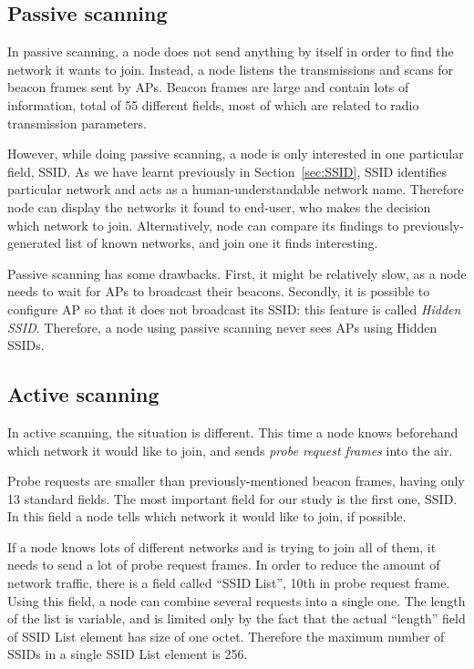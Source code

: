\documentclass[12pt,a4paper,oneside,pdftex]{report}
\begin{document}
\subsection{Passive scanning}
\label{subsec:passive_scanning}

In passive scanning, a node does not send anything by itself in order to find the network it wants to join. Instead, a node listens the transmissions and scans for beacon frames sent by APs. Beacon frames are large and contain lots of information, total of 55 different fields, most of which are related to radio transmission parameters.

However, while doing passive scanning, a node is only interested in one particular field, SSID. As we have learnt previously in Section~\ref{sec:SSID}, SSID identifies particular network and acts as a human-understandable network name. Therefore node can display the networks it found to end-user, who makes the decision which network to join. Alternatively, node can compare its findings to previously-generated list of known networks, and join one it finds interesting.

Passive scanning has some drawbacks. First, it might be relatively slow, as a node needs to wait for APs to broadcast their beacons. Secondly, it is possible to configure AP so that it does not broadcast its SSID: this feature is called \emph{Hidden SSID}. Therefore, a node using passive scanning never sees APs using Hidden SSIDs.

\subsection{Active scanning}
\label{subsec:active_scanning}

In active scanning, the situation is different. This time a node knows beforehand which network it would like to join, and sends \emph{probe request frames} into the air. 

Probe requests are smaller than previously-mentioned beacon frames, having only 13 standard fields. The most important field for our study is the first one, SSID. In this field a node tells which network it would like to join, if possible. 

If a node knows lots of different networks and is trying to join all of them, it needs to send a lot of probe request frames. In order to reduce the amount of network traffic, there is a field called ``SSID List'', 10th in probe request frame. Using this field, a node can combine several requests into a single one. The length of the list is variable, and is limited only by the fact that the actual ``length'' field of SSID List element has size of one octet. Therefore the maximum number of SSIDs in a single SSID List element is 256.
\end{document}
